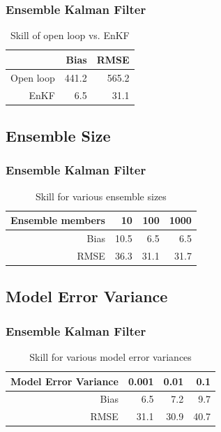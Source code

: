 \documentclass[mathserif]{beamer}
\begin{document}
\begin{frame}
  \begin{center}
    \frametitle{Ensemble Kalman Filter}
    \begin{table}
      \begin{tabular}{rrr}
        & Bias & RMSE \\
        \hline
        Open loop & 441.2 & 565.2 \\
        EnKF & 6.5 & 31.1
      \end{tabular}
      \caption{Skill of open loop vs. EnKF}
    \end{table}
  \end{center}
\end{frame}

\subsection{Ensemble Size}

\begin{frame}
  \begin{center}
    \frametitle{Ensemble Kalman Filter}
    \begin{table}
      \begin{tabular}{rrrr}
        Ensemble members & 10 & 100 & 1000 \\
        \hline
        Bias & 10.5 & 6.5 & 6.5 \\
        RMSE & 36.3 & 31.1 & 31.7
      \end{tabular}
      \caption{Skill for various ensemble sizes}
    \end{table}
  \end{center}
\end{frame}

\subsection{Model Error Variance}

\begin{frame}
  \begin{center}
    \frametitle{Ensemble Kalman Filter}
    \begin{table}
      \begin{tabular}{rrrr}
        Model Error Variance & 0.001 & 0.01 & 0.1 \\
        \hline
        Bias & 6.5 & 7.2 & 9.7\\
        RMSE & 31.1 & 30.9 & 40.7
      \end{tabular}
      \caption{Skill for various model error variances}
    \end{table}
  \end{center}
\end{frame}

%
%
\end{document}
